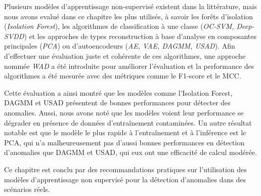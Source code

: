 Plusieurs modèles d'apprentissage non-supervisé existent dans la littérature, mais nous avons evalué dans ce chapitre les plus utilisés, à savoir les forêts d'isolation (\textit{Isolation Forest}), les algorithmes de classification à une classe (\textit{OC-SVM, Deep-SVDD}) et les approches de types reconstruction à base d'analyse en composantes principales (\textit{PCA}) ou d'autoencodeurs (\textit{AE, VAE, DAGMM, USAD}). Afin d'effectuer une évaluation juste et cohérente de ces algorithmes, une approche nommée \textit{\ac{WAD}} a été introduite pour améliorer l'évaluation et la performance des algorithmes a été mesurée avec des métriques comme le F1-score et le \ac{MCC}.

Cette évaluation a ainsi montré que les modèles comme l'Isolation Forest, DAGMM et USAD présentent de bonnes performances pour détecter des anomalies. Aussi, nous avons noté que les modèles voient leur performance se dégrader en présence de données d'entraînement contaminées. Un autre résultat notable est que le modèle le plus rapide à l'entraînement et à l'inférence est le PCA, qui n'a malheureusement pas d'aussi bonnes performances en détection d'anomalies que DAGMM et USAD, qui eux ont une efficacité de calcul modérée.

Ce chapitre est conclu par des recommandations pratiques sur l’utilisation des modèles d’apprentissage non supervisé pour la détection d’anomalies dans des scénarios réels.





